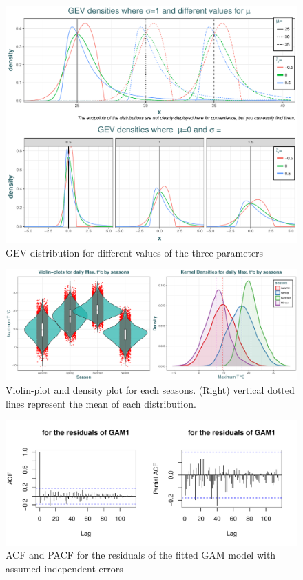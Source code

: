 \begin{figure}[!htb]
	\includegraphics[width=\linewidth]{gevdif.pdf}\caption{GEV distribution for different values of the three parameters }\label{fig:gevdif}
\end{figure}




\begin{figure}[!htb]
	\includegraphics[width=1\linewidth]{violin_density.pdf}\caption{ Violin-plot and density plot for each seasons. (Right) vertical dotted lines represent the mean of each distribution.}\label{fig:violin_density}
\end{figure}

\begin{figure}[!htb]
	\includegraphics[width=\linewidth]{acfresgam.pdf}\caption{ACF and PACF for the residuals of the fitted GAM model with assumed independent errors }\label{fig:acfresgam1}
\end{figure}

